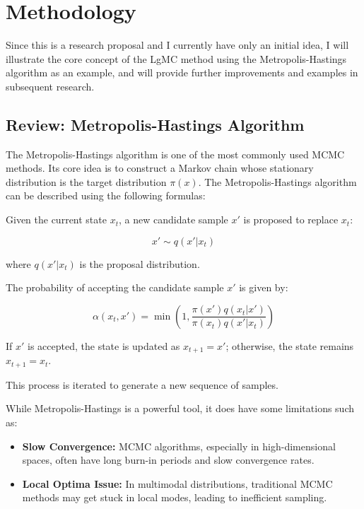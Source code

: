 \documentclass[twocolumn]{article}
\begin{document}
\section{Methodology}

Since this is a research proposal and I currently have only an initial idea, I will illustrate the core concept of the LgMC method using the Metropolis-Hastings algorithm as an example, and will provide further improvements and examples in subsequent research.

\subsection{Review: Metropolis-Hastings Algorithm}

The Metropolis-Hastings algorithm is one of the most commonly used MCMC methods. Its core idea is to construct a Markov chain whose stationary distribution is the target distribution $\pi(x)$. The Metropolis-Hastings algorithm can be described using the following formulas:

Given the current state $x_t$, a new candidate sample $x'$ is proposed to replace $x_t$:

\[
x' \sim q(x'|x_t)
\]

where $q(x'|x_t)$ is the proposal distribution.

The probability of accepting the candidate sample $x'$ is given by:

\[
\alpha(x_t, x') = \min \left(1, \frac{\pi(x') q(x_t|x')}{\pi(x_t) q(x'|x_t)} \right)
\]

If $x'$ is accepted, the state is updated as $x_{t+1} = x'$; otherwise, the state remains $x_{t+1} = x_t$.

This process is iterated to generate a new sequence of samples.


While Metropolis-Hastings is a powerful tool, it does have some limitations such as:

\begin{itemize}
    \item \textbf{Slow Convergence:} MCMC algorithms, especially in high-dimensional spaces, often have long burn-in periods and slow convergence rates.
    \item \textbf{Local Optima Issue:} In multimodal distributions, traditional MCMC methods may get stuck in local modes, leading to inefficient sampling.
\end{itemize}
\end{document}
